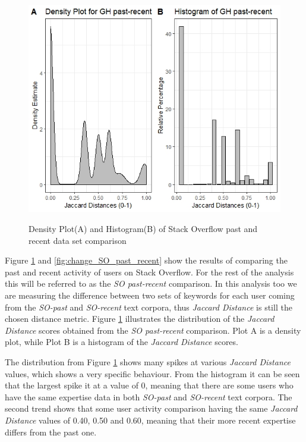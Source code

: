         \begin{figure}
          \centering
          \includegraphics[width=\textwidth]{figures/SO_past-recent.jpeg}\\
          \caption{Density Plot(A) and Histogram(B) of Stack Overflow past and recent data set comparison}
          \label{fig:SO_past_recent}
        \end{figure}
        
        Figure \ref{fig:SO_past_recent} and \ref{fig:change_SO_past_recent} show the results of comparing the past and recent activity of users on Stack Overflow. For the rest of the analysis this will be referred to as the \emph{SO past-recent} comparison. In this analysis too we are measuring the difference between two sets of keywords for each user coming from the \emph{SO-past} and \emph{SO-recent} text corpora, thus \emph{Jaccard Distance} is still the chosen distance metric. Figure \ref{fig:SO_past_recent} illustrates the distribution of the \emph{Jaccard Distance} scores obtained from the \emph{SO past-recent} comparison. Plot A is a density plot, while Plot B is a histogram of the \emph{Jaccard Distance} scores. 
         
        The distribution from Figure \ref{fig:SO_past_recent} shows many spikes at various \emph{Jaccard Distance} values, which shows a very specific behaviour. From the histogram it can be seen that the largest spike it at a value of 0, meaning that there are some users who have the same expertise data in both \emph{SO-past} and \emph{SO-recent} text corpora. The second trend shows that some user activity comparison having the same \emph{Jaccard Distance} values of 0.40, 0.50 and 0.60, meaning that their more recent expertise differs from the past one.
        

